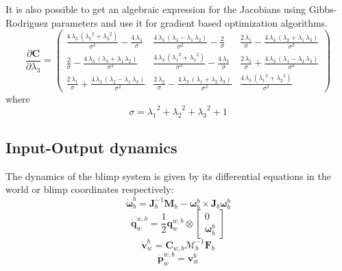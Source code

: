 It is also possible to get an algebraic expression for the Jacobians using Gibbs-Rodriguez parameters and use it for gradient based optimization algorithms.
\begin{equation}
\frac{\partial \mathbf{C}}{\partial \lambda_3} = \left(\begin{array}{ccc} \frac{4\, {\lambda_3}\, \left({{\lambda_2}}^2 + {{\lambda_3}}^2\right)}{{\sigma}^2} - \frac{4\, {\lambda_3}}{\sigma} & \frac{4\, {\lambda_3}\, \left({\lambda_3} - {\lambda_1}\, {\lambda_2}\right)}{{\sigma}^2} - \frac{2}{\sigma} & \frac{2\, {\lambda_1}}{\sigma} - \frac{4\, {\lambda_3}\, \left({\lambda_2} + {\lambda_1}\, {\lambda_3}\right)}{{\sigma}^2}\\ \frac{2}{\sigma} - \frac{4\, {\lambda_3}\, \left({\lambda_3} + {\lambda_1}\, {\lambda_2}\right)}{{\sigma}^2} & \frac{4\, {\lambda_3}\, \left({{\lambda_1}}^2 + {{\lambda_3}}^2\right)}{{\sigma}^2} - \frac{4\, {\lambda_3}}{\sigma} & \frac{2\, {\lambda_2}}{\sigma} + \frac{4\, {\lambda_3}\, \left({\lambda_1} - {\lambda_2}\, {\lambda_3}\right)}{{\sigma}^2}\\ \frac{2\, {\lambda_1}}{\sigma} + \frac{4\, {\lambda_3}\, \left({\lambda_2} - {\lambda_1}\, {\lambda_3}\right)}{{\sigma}^2} & \frac{2\, {\lambda_2}}{\sigma} - \frac{4\, {\lambda_3}\, \left({\lambda_1} + {\lambda_2}\, {\lambda_3}\right)}{{\sigma}^2} & \frac{4\, {\lambda_3}\, \left({{\lambda_1}}^2 + {{\lambda_2}}^2\right)}{{\sigma}^2} \end{array}\right)
\end{equation}
where
\begin{equation}
\sigma = {\lambda_1}^2 + {\lambda_2}^2 + {\lambda_3}^2 + 1
\end{equation}
\subsection{Input-Output dynamics}
The dynamics of the blimp system is given by its differential equations in the world or blimp coordinates respectively:
\begin{equation}
\label{eqn_dyn_angular_velocity}
\dot{\boldsymbol{\omega}}_b^b = \mathbf{J}_b^{-1} \mathbf{M}_b  - \boldsymbol{\omega}_b^b \times \mathbf{J}_b \boldsymbol{\omega}_b^b
\end{equation}
\begin{equation}
\label{eqn_dyn_orientation}
\dot{\mathbf{q}}_w^{w,b} = \frac{1}{2} \mathbf{q}_w^{w,b} \otimes \left[
\begin{array}{c}
	0 \\ \boldsymbol{\omega}_b^b
\end{array} \right]
\end{equation}
\begin{equation}
\label{eqn_dyn_velocity}
\dot{\mathbf{v}}_w^b = \mathbf{C}_{w,b}\mathbf{\mathcal{M}}_b^{-1} \mathbf{F}_b
\end{equation}
\begin{equation}
\label{eqn_dyn_position}
\dot{\mathbf{p}}_w^{w,b} = \mathbf{v}_w^b
\end{equation}

